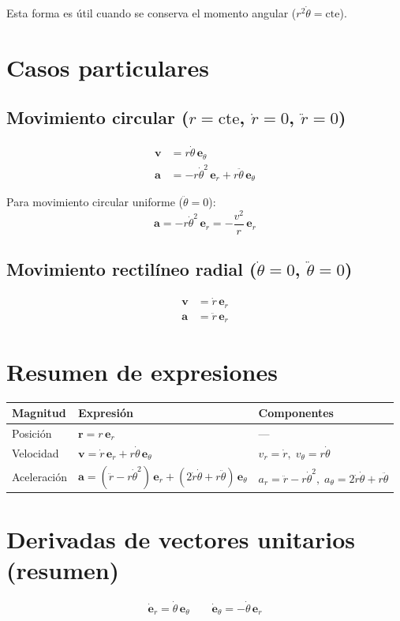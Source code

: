 \documentclass[12pt,a4paper]{article}
\begin{document}
Esta forma es útil cuando se conserva el momento angular ($r^2\dot{\theta} = \text{cte}$).

\section{Casos particulares}

\subsection{Movimiento circular ($r = \text{cte}$, $\dot{r} = 0$, $\ddot{r} = 0$)}

\begin{align*}
    \mathbf{v} &= r\dot{\theta}\,\mathbf{e}_\theta \\
    \mathbf{a} &= -r\dot{\theta}^2\,\mathbf{e}_r + r\ddot{\theta}\,\mathbf{e}_\theta
\end{align*}

Para movimiento circular uniforme ($\ddot{\theta} = 0$):
\[
\mathbf{a} = -r\dot{\theta}^2\,\mathbf{e}_r = -\frac{v^2}{r}\,\mathbf{e}_r
\]

\subsection{Movimiento rectilíneo radial ($\dot{\theta} = 0$, $\ddot{\theta} = 0$)}

\begin{align*}
    \mathbf{v} &= \dot{r}\,\mathbf{e}_r \\
    \mathbf{a} &= \ddot{r}\,\mathbf{e}_r
\end{align*}

\section{Resumen de expresiones}

\begin{center}
\begin{tabular}{lll}
\toprule
Magnitud & Expresión & Componentes \\
\midrule
Posición & $\mathbf{r} = r\,\mathbf{e}_r$ & --- \\
Velocidad & $\mathbf{v} = \dot{r}\,\mathbf{e}_r + r\dot{\theta}\,\mathbf{e}_\theta$ &
$v_r = \dot{r},\; v_\theta = r\dot{\theta}$ \\
Aceleración & $\mathbf{a} = (\ddot{r} - r\dot{\theta}^2)\,\mathbf{e}_r
            + (2\dot{r}\dot{\theta} + r\ddot{\theta})\,\mathbf{e}_\theta$ &
$a_r = \ddot{r} - r\dot{\theta}^2,\; a_\theta = 2\dot{r}\dot{\theta} + r\ddot{\theta}$ \\
\bottomrule
\end{tabular}
\end{center}

\section*{Derivadas de vectores unitarios (resumen)}

\[
\boxed{\dot{\mathbf{e}}_r = \dot{\theta}\,\mathbf{e}_\theta}
\qquad
\boxed{\dot{\mathbf{e}}_\theta = -\dot{\theta}\,\mathbf{e}_r}
\]
\end{document}
